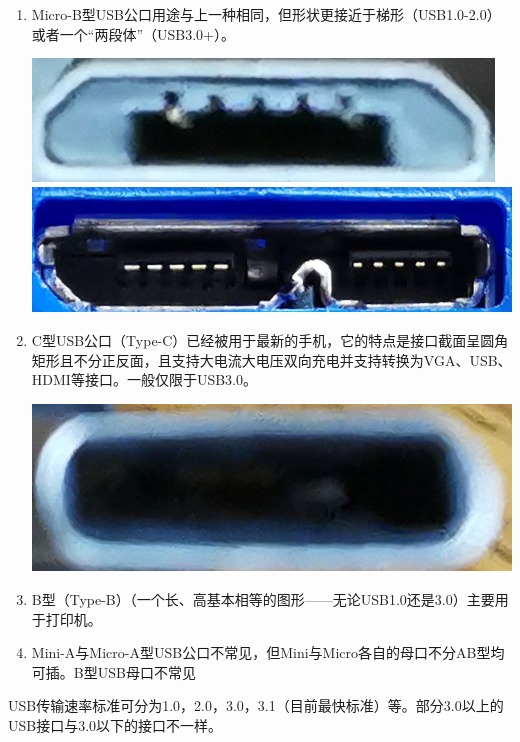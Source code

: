 \begin{enumerate}
\begin{center}
	\end{center}
	\item Micro-B型USB公口用途与上一种相同，但形状更接近于梯形（USB1.0-2.0）或者一个“两段体”（USB3.0+）。
	\begin{center}
		\includegraphics[scale=0.2]{pic/Micro-USB-B-1}\\\includegraphics[scale=0.1]{pic/Micro-USB-B-2}
	\end{center}
	\item C型USB公口（Type-C）已经被用于最新的手机，它的特点是接口截面呈圆角矩形且不分正反面，且支持大电流大电压双向充电并支持转换为VGA、USB、HDMI等接口。一般仅限于USB3.0。
	\begin{center}
		\includegraphics[scale=0.15]{pic/C-USB-1}
	\end{center}
	\item B型（Type-B）（一个长、高基本相等的图形——无论USB1.0还是3.0）主要用于打印机。
	\item Mini-A与Micro-A型USB公口不常见，但Mini与Micro各自的母口不分AB型均可插。B型USB母口不常见
\end{enumerate}
USB传输速率标准可分为1.0，2.0，3.0，3.1（目前最快标准）等。部分3.0以上的USB接口与3.0以下的接口不一样。
